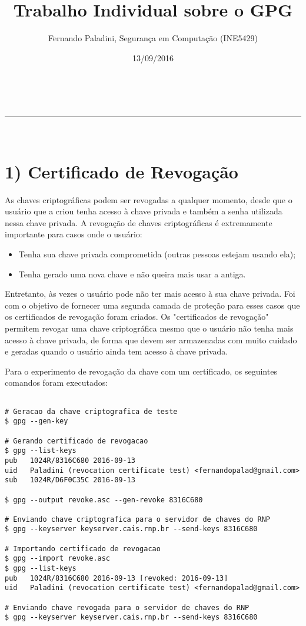 \documentclass[a4paper,11pt]{article}
\makeatletter
\newcommand{\linia}{\rule{\linewidth}{0.5pt}}
\theoremstyle{mytheor}
\renewcommand{\maketitle}{
\begin{center}
\vspace{2ex}
{\huge \textsc{\@title}}
\vspace{1ex}
\\
\linia\\
\@author \hfill \@date
\vspace{4ex}
\end{center}
}
\makeatother
\begin{document}
\title{Trabalho Individual sobre o GPG}

\author{Fernando Paladini, Segurança em Computação (INE5429)}

\date{13/09/2016}

\maketitle

\section*{1) Certificado de Revogação}

As chaves criptográficas podem ser revogadas a qualquer momento, desde que o usuário que a criou tenha acesso à chave privada e também a senha utilizada nessa chave privada. A revogação de chaves criptográficas é extremamente importante para casos onde o usuário:

\begin{itemize}
    \item Tenha sua chave privada comprometida (outras pessoas estejam usando ela);
    \item Tenha gerado uma nova chave e não queira mais usar a antiga.
\end{itemize}

Entretanto, às vezes o usuário pode não ter mais acesso à sua chave privada. Foi com o objetivo de fornecer uma segunda camada de proteção para esses casos que os certificados de revogação foram criados. Os "certificados de revogação" permitem revogar uma chave criptográfica mesmo que o usuário não tenha mais acesso à chave privada, de forma que devem ser armazenadas com muito cuidado e geradas quando o usuário ainda tem acesso à chave privada.

Para o experimento de revogação da chave com um certificado, os seguintes comandos foram executados:

\begin{lstlisting}[label={list:first},caption=Teste de revogação de chaves criptográficas com certificado de revogação.]

# Geracao da chave criptografica de teste
$ gpg --gen-key

# Gerando certificado de revogacao
$ gpg --list-keys
pub   1024R/8316C680 2016-09-13
uid   Paladini (revocation certificate test) <fernandopalad@gmail.com>
sub   1024R/D6F0C35C 2016-09-13

$ gpg --output revoke.asc --gen-revoke 8316C680

# Enviando chave criptografica para o servidor de chaves do RNP
$ gpg --keyserver keyserver.cais.rnp.br --send-keys 8316C680

# Importando certificado de revogacao
$ gpg --import revoke.asc
$ gpg --list-keys
pub   1024R/8316C680 2016-09-13 [revoked: 2016-09-13]
uid   Paladini (revocation certificate test) <fernandopalad@gmail.com>

# Enviando chave revogada para o servidor de chaves do RNP
$ gpg --keyserver keyserver.cais.rnp.br --send-keys 8316C680
\end{lstlisting}
\end{document}
